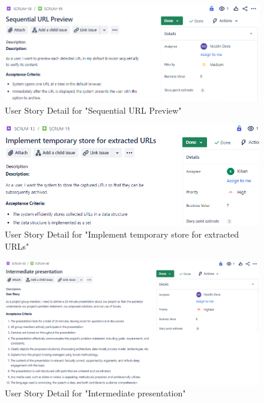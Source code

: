 \begin{figure}[h!]
    \centering
    \includegraphics[width=1\textwidth]{pictures/Scrum/Sprint 2/UserStory_7}
    \caption{User Story Detail for "Sequential URL Preview"}
    \label{fig:sprint_2_userstory_4}
\end{figure}
\begin{figure}[h!]
    \centering
    \includegraphics[width=1\textwidth]{pictures/Scrum/Sprint 2/UserStory_6}
    \caption{User Story Detail for "Implement temporary store for extracted URLs"}
    \label{fig:sprint_2_userstory_5}
\end{figure}
\begin{figure}[h!]
    \centering
    \includegraphics[width=1\textwidth]{pictures/Scrum/Sprint 2/UserStory_12}
    \caption{User Story Detail for "Intermediate presentation"}
    \label{fig:sprint_2_userstory_6}
\end{figure}
\clearpage

